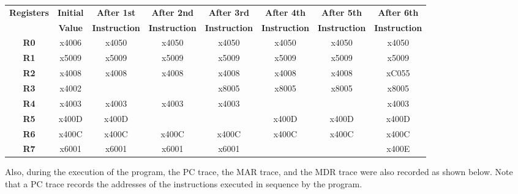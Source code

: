 \documentclass{patt}
\begin{document}
\begin{exercises}
\begin{table}[h*]
\begin{tabular}{|c|c|c|c|c|c|c|c|} \hline
{\bf Registers} & {\bf Initial} & {\bf After 1st} & {\bf After 2nd} & {\bf After 3rd} & {\bf After 4th} &
{\bf After 5th} & {\bf After 6th} \\
          & {\bf Value}   & {\bf Instruction} & {\bf Instruction}  & {\bf Instruction} &
       {\bf Instruction} &
       {\bf Instruction} & {\bf Instruction} \\
\hline
{\bf R0} & x4006 & x4050 & x4050 & x4050 & x4050 & x4050 & x4050\\
\hline                                                                       
{\bf R1} & x5009 & x5009 & x5009 & x5009 & x5009 & x5009 & x5009\\
\hline                                                                       
{\bf R2} & x4008 & x4008 & x4008 & x4008 & x4008 & x4008 & xC055\\
\hline                                                                       
{\bf R3} & x4002 &       &       & x8005 & x8005 & x8005 & x8005\\
\hline                                                                       
{\bf R4} & x4003 & x4003 & x4003 & x4003 &       &       & x4003\\
\hline                                                                       
{\bf R5} & x400D & x400D &       &       & x400D & x400D & x400D\\
\hline                                                                       
{\bf R6} & x400C & x400C & x400C & x400C & x400C & x400C & x400C\\
\hline                                                                       
{\bf R7} & x6001 & x6001 & x6001 & x6001 &       &       & x400E\\
\hline
\end{tabular}
\end{table}
\vspace{0.2in}

\noindent Also, during the execution of the program, the PC trace, the MAR
trace, and the MDR trace were also recorded as shown below.
Note that a PC trace records the addresses of the instructions executed in sequence by the program.
\vspace{0.2in}

\begin{center}
\begin{tabular}{lcr} 


\end{tabular}
\end{center}
\end{exercises}
\end{document}
